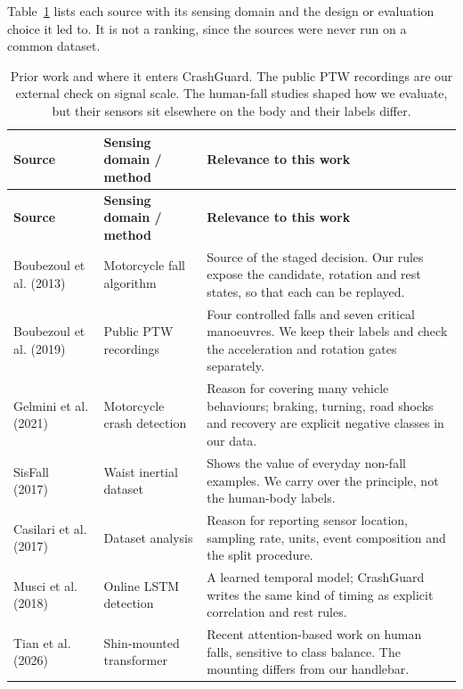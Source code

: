 \documentclass[10pt,a4paper]{article}
\begin{document}
Table~\ref{tab:prior} lists each source with its sensing domain and the design or evaluation choice it led to. It is not a ranking, since the sources were never run on a common dataset.

\small
\begin{longtable}{|>{\raggedright\arraybackslash}p{.19\linewidth}|>{\raggedright\arraybackslash}p{.23\linewidth}|>{\raggedright\arraybackslash}p{.49\linewidth}|}
\caption{Prior work and where it enters CrashGuard. The public PTW recordings are our external check on signal scale. The human-fall studies shaped how we evaluate, but their sensors sit elsewhere on the body and their labels differ.}\label{tab:prior}\\
\hline
\textbf{Source} & \textbf{Sensing domain / method} & \textbf{Relevance to this work}\\\hline\endfirsthead
\hline
\textbf{Source} & \textbf{Sensing domain / method} & \textbf{Relevance to this work}\\\hline\endhead
Boubezoul et al. (2013)~\cite{boubezoul2013algorithm} & Motorcycle fall algorithm & Source of the staged decision. Our rules expose the candidate, rotation and rest states, so that each can be replayed.\\\hline
Boubezoul et al. (2019)~\cite{boubezoul2019dataset} & Public PTW recordings & Four controlled falls and seven critical manoeuvres. We keep their labels and check the acceleration and rotation gates separately.\\\hline
Gelmini et al. (2021)~\cite{gelmini2021novel} & Motorcycle crash detection & Reason for covering many vehicle behaviours; braking, turning, road shocks and recovery are explicit negative classes in our data.\\\hline
SisFall (2017)~\cite{sisfall} & Waist inertial dataset & Shows the value of everyday non-fall examples. We carry over the principle, not the human-body labels.\\\hline
Casilari et al. (2017)~\cite{survey} & Dataset analysis & Reason for reporting sensor location, sampling rate, units, event composition and the split procedure.\\\hline
Musci et al. (2018)~\cite{musci} & Online LSTM detection & A learned temporal model; CrashGuard writes the same kind of timing as explicit correlation and rest rules.\\\hline
Tian et al. (2026)~\cite{tian2026transformer} & Shin-mounted transformer & Recent attention-based work on human falls, sensitive to class balance. The mounting differs from our handlebar.\\\hline

\end{longtable}
\end{document}
